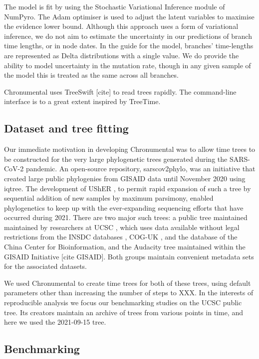 The model is fit by using the Stochastic Variational Inference module of NumPyro. The Adam optimiser is used to adjust the latent variables to maximise the evidence lower bound. Although this approach uses a form of variational inference, we do not aim to estimate the uncertainty in our predictions of branch time lengths, or in node dates. In the guide for the model, branches' time-lengths are represented as Delta distributions with a single value. We do provide the ability to model uncertainty in the mutation rate, though in any given sample of the model this is treated as the same across all branches.

Chronumental uses TreeSwift [cite] to read trees rapidly. The command-line interface is to a great extent inspired by TreeTime.


\subsection*{Dataset and tree fitting}

Our immediate motivation in developing Chronumental was to allow time trees to be constructed for the very large phylogenetic trees generated during the SARS-CoV-2 pandemic. An open-source repository, sarscov2phylo, was an initiative that created large public phylogenies from GISAID data until November 2020 using iqtree. The development of UShER \cite{Turakhia2021-la}, to permit rapid expansion of such a tree by sequential addition of new samples by maximum parsimony, enabled phylogenetics to keep up with the ever-expanding sequencing efforts that have occurred during 2021. There are two major such trees: a public tree maintained maintained by researchers at UCSC \cite{McBroome2021-fn}, which uses data available without legal restrictions from the INSDC databases \cite{Arita2021-dc}, COG-UK \cite{Nicholls2021-fz}, and the database of the China Center for Bioinformation, and the Audacity tree maintained within the GISAID Initiative [cite GISAID]. Both groups maintain convenient metadata sets for the associated datasets.

We used Chronumental to create time trees for both of these trees, using default parameters other than increasing the number of steps to XXX. In the interests of reproducible analysis we focus our benchmarking studies on the UCSC public tree. Its creators maintain an archive of trees from various points in time, and here we used the 2021-09-15 tree.


\subsection*{Benchmarking}

